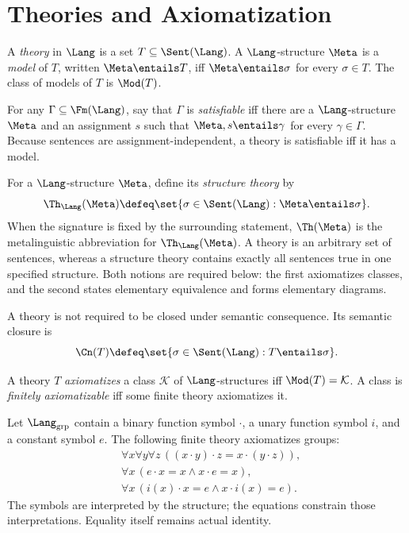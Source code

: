 \chapter{Theories and Axiomatization}
\label{ch:fol-theories}

\begin{definition}
\label{def:fol-theory-satisfiability}
A \emph{theory} in \(\Lang\) is a set
\(T\subseteq\Sent(\Lang)\).  A \(\Lang\)-structure \(\Meta\) is a
\emph{model} of \(T\), written \(\Meta\entails T\), iff
\(\Meta\entails\sigma\) for every \(\sigma\in T\).  The class of models of
\(T\) is \(\Mod(T)\).

For any \(\Gamma\subseteq\Fm(\Lang)\), say that \(\Gamma\) is
\emph{satisfiable} iff there are a \(\Lang\)-structure \(\Meta\) and an
assignment \(s\) such that \(\Meta,s\entails\gamma\) for every
\(\gamma\in\Gamma\).  Because sentences are assignment-independent, a theory
is satisfiable iff it has a model.

For a \(\Lang\)-structure \(\Meta\), define its \emph{structure theory} by
\[
 \Th_{\Lang}(\Meta)
 \defeq\set{\sigma\in\Sent(\Lang):\Meta\entails\sigma}.
\]
When the signature is fixed by the surrounding statement, \(\Th(\Meta)\) is
the metalinguistic abbreviation for \(\Th_{\Lang}(\Meta)\).  A theory is an
arbitrary set of sentences, whereas a structure theory contains exactly all
sentences true in one specified structure.  Both notions are required below:
the first axiomatizes classes, and the second states elementary equivalence and
forms elementary diagrams.
\end{definition}

A theory is not required to be closed under semantic consequence.  Its
semantic closure is
\[
 \Cn(T)\defeq\set{\sigma\in\Sent(\Lang):T\entails\sigma}.
\]

\begin{definition}[Axiomatization]
A theory \(T\) \emph{axiomatizes} a class \(\mathcal K\) of
\(\Lang\)-structures iff \(\Mod(T)=\mathcal K\).  A class is
\emph{finitely axiomatizable} iff some finite theory axiomatizes it.
\end{definition}

\begin{example}[Groups]
Let \(\Lang_{\mathrm{grp}}\) contain a binary function symbol \(\cdot\), a
unary function symbol \(i\), and a constant symbol \(e\).  The following
finite theory axiomatizes groups:
\[
\begin{aligned}
&\forall x\forall y\forall z\,
  ((x\cdot y)\cdot z=x\cdot(y\cdot z)),\\
&\forall x\,(e\cdot x=x\land x\cdot e=x),\\
&\forall x\,(i(x)\cdot x=e\land x\cdot i(x)=e).
\end{aligned}
\]
The symbols are interpreted by the structure; the equations constrain those
interpretations.  Equality itself remains actual identity.
\end{example}


